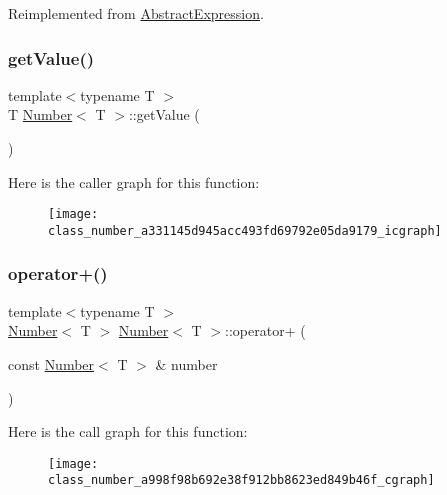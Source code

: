 Reimplemented from \mbox{\hyperlink{class_abstract_expression_a9f19c05e663491688cdf4423e002a391}{Abstract\+Expression}}.

\mbox{\label{class_number_a331145d945acc493fd69792e05da9179}} 
\subsubsection{\texorpdfstring{getValue()}{getValue()}}
{\footnotesize\ttfamily template$<$typename T $>$ \\
T \mbox{\hyperlink{class_number}{Number}}$<$ T $>$\+::get\+Value (\begin{DoxyParamCaption}{ }\end{DoxyParamCaption})}

Here is the caller graph for this function\+:
\nopagebreak
\begin{figure}[H]
\begin{center}
\leavevmode
\texttt{[image: class\_number\_a331145d945acc493fd69792e05da9179\_icgraph]}
\end{center}
\end{figure}
\mbox{\label{class_number_a998f98b692e38f912bb8623ed849b46f}} 
\subsubsection{\texorpdfstring{operator+()}{operator+()}}
{\footnotesize\ttfamily template$<$typename T $>$ \\
\mbox{\hyperlink{class_number}{Number}}$<$ T $>$ \mbox{\hyperlink{class_number}{Number}}$<$ T $>$\+::operator+ (\begin{DoxyParamCaption}\item[{const \mbox{\hyperlink{class_number}{Number}}$<$ T $>$ \&}]{number }\end{DoxyParamCaption})\hspace{0.3cm}{\ttfamily [inline]}}

Here is the call graph for this function\+:
\nopagebreak
\begin{figure}[H]
\begin{center}
\leavevmode
\texttt{[image: class\_number\_a998f98b692e38f912bb8623ed849b46f\_cgraph]}
\end{center}
\end{figure}
\mbox{\label{class_number_ab6cca4f8b5b21539b24d431a920c66e6}} 
